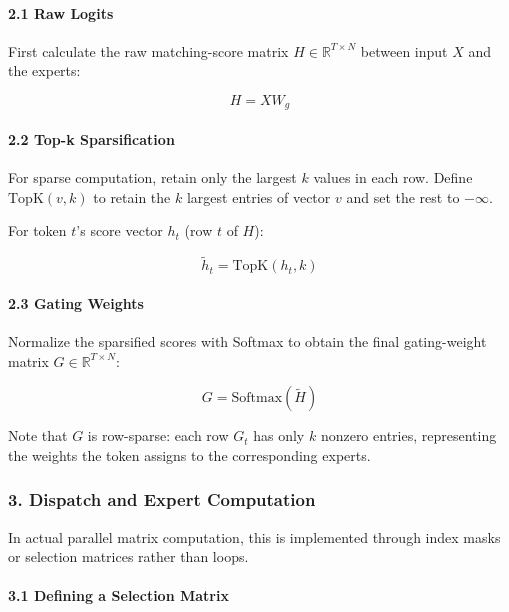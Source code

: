 \hypertarget{raw-logits}{%
\paragraph{2.1 Raw Logits}\label{raw-logits}}

First calculate the raw matching-score matrix \(H \in \mathbb{R}^{T \times N}\) between input \(X\) and the experts:

\[
H = XW_g
\]

\hypertarget{top-k-sparsification}{%
\paragraph{2.2 Top-k Sparsification}\label{top-k-sparsification}}

For sparse computation, retain only the largest \(k\) values in each row. Define \(\mathrm{TopK}(v,k)\) to retain the \(k\) largest entries of vector \(v\) and set the rest to \(-\infty\).

For token \(t\)'s score vector \(h_t\) (row \(t\) of \(H\)):

\[
\tilde{h}_t = \mathrm{TopK}(h_t,k)
\]

\hypertarget{gating-weights}{%
\paragraph{2.3 Gating Weights}\label{gating-weights}}

Normalize the sparsified scores with Softmax to obtain the final gating-weight matrix \(G \in \mathbb{R}^{T \times N}\):

\[
G = \mathrm{Softmax}(\tilde{H})
\]

Note that \(G\) is row-sparse: each row \(G_t\) has only \(k\) nonzero entries, representing the weights the token assigns to the corresponding experts.

\hypertarget{dispatch-and-expert-computation}{%
\subsubsection{3. Dispatch and Expert Computation}\label{dispatch-and-expert-computation}}

In actual parallel matrix computation, this is implemented through index masks or selection matrices rather than loops.

\hypertarget{defining-a-selection-matrix}{%
\paragraph{3.1 Defining a Selection Matrix}\label{defining-a-selection-matrix}}

